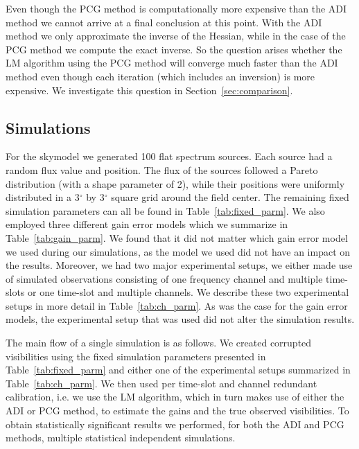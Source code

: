 \documentclass[useAMS,usenatbib]{mn2e}
\begin{document}

Even though the PCG method is computationally more expensive than the ADI method we cannot arrive at a final conclusion at this point. With the ADI method 
we only approximate the inverse of the Hessian, while in the case of the PCG method we compute the exact inverse. So the question arises whether the LM algorithm using the PCG method 
will converge much faster than the ADI method even though each iteration (which includes an inversion) is more expensive. We investigate this question in Section~\ref{sec:comparison}.

\subsection{Simulations}
\label{sec:simulations}
For the skymodel we generated 100 flat spectrum sources. Each source had a random flux value and position. The flux of the sources followed a Pareto distribution (with a shape parameter of 2), while their positions were uniformly 
distributed in a 3$^{\circ}$ by 3$^{\circ}$ square grid around the field center. The remaining fixed simulation parameters can all be found in Table~\ref{tab:fixed_parm}. 
We also employed three different gain error models which we summarize in Table~\ref{tab:gain_parm}. We found that it did not matter which gain error model we used during
our simulations, as the model we used did not have an impact on the results. Moreover, we had two major experimental setups, we either made use of simulated observations consisting of one frequency channel and multiple time-slots or one time-slot and multiple channels.
We describe these two experimental setups in more detail in Table~\ref{tab:ch_parm}. As was the case for the gain error models, the experimental setup 
that was used did not alter the simulation results. 

The main flow of a single simulation is as follows. We created corrupted visibilities using the fixed simulation parameters presented in Table~\ref{tab:fixed_parm} and either one of the experimental setups summarized in Table~\ref{tab:ch_parm}. We then used per time-slot and channel redundant calibration, i.e. we use the LM algorithm, which in turn makes use of either the ADI or PCG method, to 
estimate the gains and the true observed visibilities. To obtain statistically significant results we performed, for both the ADI and PCG methods, multiple statistical independent simulations. 
\end{document}
